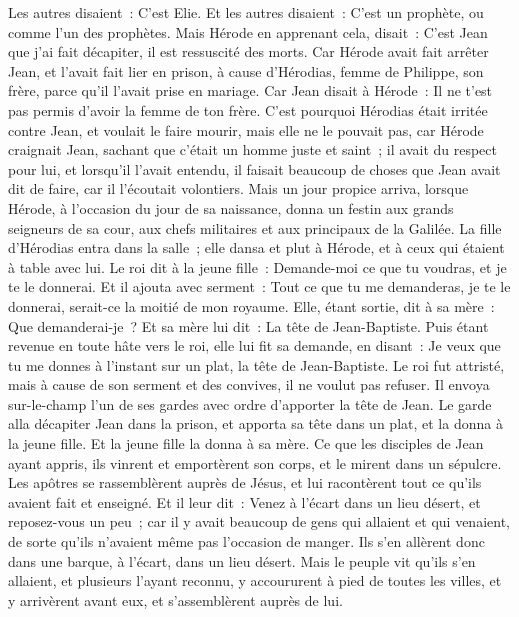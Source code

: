 \begin{multicols}{2}
Les autres disaient~: C'est Elie. Et les autres disaient~: C'est un prophète, ou comme l'un des prophètes.
Mais Hérode en apprenant cela, disait~: C'est Jean que j'ai fait décapiter, il est ressuscité des morts.
Car Hérode avait fait arrêter Jean, et l'avait fait lier en prison, à cause d'Hérodias, femme de Philippe, son frère, parce qu'il l'avait prise en mariage.
Car Jean disait à Hérode~: Il ne t'est pas permis d'avoir la femme de ton frère.
C'est pourquoi Hérodias était irritée contre Jean, et voulait le faire mourir,
mais elle ne le pouvait pas, car Hérode craignait Jean, sachant que c'était un homme juste et saint~; il avait du respect pour lui, et lorsqu'il l'avait entendu, il faisait beaucoup de choses que Jean avait dit de faire, car il l'écoutait volontiers.
 Mais un jour propice arriva, lorsque Hérode, à l'occasion du jour de sa naissance, donna un festin aux grands seigneurs de sa cour, aux chefs militaires et aux principaux de la Galilée.
La fille d'Hérodias entra dans la salle~; elle dansa et plut à Hérode, et à ceux qui étaient à table avec lui. Le roi dit à la jeune fille~: Demande-moi ce que tu voudras, et je te le donnerai.
Et il ajouta avec serment~: Tout ce que tu me demanderas, je te le donnerai, serait-ce la moitié de mon royaume.
Elle, étant sortie, dit à sa mère~: Que demanderai-je~? Et sa mère lui dit~: La tête de Jean-Baptiste.
Puis étant revenue en toute hâte vers le roi, elle lui fit sa demande, en disant~: Je veux que tu me donnes à l'instant sur un plat, la tête de Jean-Baptiste.
Le roi fut attristé, mais à cause de son serment et des convives, il ne voulut pas refuser.
Il envoya sur-le-champ l'un de ses gardes avec ordre d'apporter la tête de Jean.
Le garde alla décapiter Jean dans la prison, et apporta sa tête dans un plat, et la donna à la jeune fille. Et la jeune fille la donna à sa mère.
Ce que les disciples de Jean ayant appris, ils vinrent et emportèrent son corps, et le mirent dans un sépulcre.
Les apôtres se rassemblèrent auprès de Jésus, et lui racontèrent tout ce qu'ils avaient fait et enseigné.
Et il leur dit~: Venez à l'écart dans un lieu désert, et reposez-vous un peu~; car il y avait beaucoup de gens qui allaient et qui venaient, de sorte qu'ils n'avaient même pas l'occasion de manger.
Ils s'en allèrent donc dans une barque, à l'écart, dans un lieu désert.
Mais le peuple vit qu'ils s'en allaient, et plusieurs l'ayant reconnu, y accoururent à pied de toutes les villes, et y arrivèrent avant eux, et s'assemblèrent auprès de lui.

\end{multicols}
